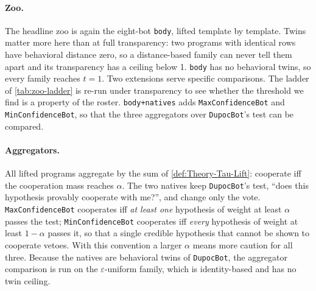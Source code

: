 \paragraph{Zoo.} The headline zoo is again the eight-bot \texttt{body}, lifted template by template. Twins matter more here than at full transparency: two programs with identical rows have behavioral distance zero, so a distance-based family can never tell them apart and its transparency has a ceiling below 1. \texttt{body} has no behavioral twins, so every family reaches $t = 1$. Two extensions serve specific comparisons. The ladder of \cref{tab:zoo-ladder} is re-run under transparency to see whether the threshold we find is a property of the roster. \texttt{body+natives} adds \texttt{MaxConfidenceBot} and \texttt{MinConfidenceBot}, so that the three aggregators over \texttt{DupocBot}'s test can be compared.

\paragraph{Aggregators.} All lifted programs aggregate by the sum of \cref{def:Theory-Tau-Lift}: cooperate iff the cooperation mass reaches $\alpha$. The two natives keep \texttt{DupocBot}'s test, \enquote{does this hypothesis provably cooperate with me?}, and change only the vote. \texttt{MaxConfidenceBot} cooperates iff \emph{at least one} hypothesis of weight at least $\alpha$ passes the test; \texttt{MinConfidenceBot} cooperates iff \emph{every} hypothesis of weight at least $1-\alpha$ passes it, so that a single credible hypothesis that cannot be shown to cooperate vetoes. With this convention a larger $\alpha$ means more caution for all three. Because the natives are behavioral twins of \texttt{DupocBot}, the aggregator comparison is run on the $\varepsilon$-uniform family, which is identity-based and has no twin ceiling.

